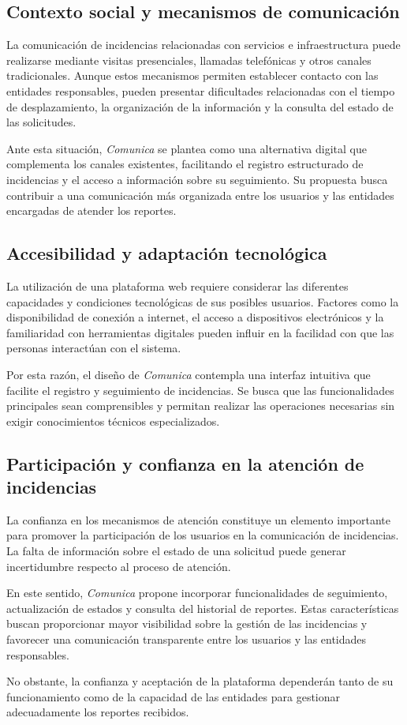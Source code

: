 \subsection{Contexto social y mecanismos de comunicación}
La comunicación de incidencias relacionadas con servicios e infraestructura puede realizarse mediante visitas presenciales, llamadas telefónicas y otros canales tradicionales. Aunque estos mecanismos permiten establecer contacto con las entidades responsables, pueden presentar dificultades relacionadas con el tiempo de desplazamiento, la organización de la información y la consulta del estado de las solicitudes.

Ante esta situación, \textit{Comunica} se plantea como una alternativa digital que complementa los canales existentes, facilitando el registro estructurado de incidencias y el acceso a información sobre su seguimiento. Su propuesta busca contribuir a una comunicación más organizada entre los usuarios y las entidades encargadas de atender los reportes.

\subsection{Accesibilidad y adaptación tecnológica}
La utilización de una plataforma web requiere considerar las diferentes capacidades y condiciones tecnológicas de sus posibles usuarios. Factores como la disponibilidad de conexión a internet, el acceso a dispositivos electrónicos y la familiaridad con herramientas digitales pueden influir en la facilidad con que las personas interactúan con el sistema.

Por esta razón, el diseño de \textit{Comunica} contempla una interfaz intuitiva que facilite el registro y seguimiento de incidencias. Se busca que las funcionalidades principales sean comprensibles y permitan realizar las operaciones necesarias sin exigir conocimientos técnicos especializados.

\subsection{Participación y confianza en la atención de incidencias}
La confianza en los mecanismos de atención constituye un elemento importante para promover la participación de los usuarios en la comunicación de incidencias. La falta de información sobre el estado de una solicitud puede generar incertidumbre respecto al proceso de atención.

En este sentido, \textit{Comunica} propone incorporar funcionalidades de seguimiento, actualización de estados y consulta del historial de reportes. Estas características buscan proporcionar mayor visibilidad sobre la gestión de las incidencias y favorecer una comunicación transparente entre los usuarios y las entidades responsables.

No obstante, la confianza y aceptación de la plataforma dependerán tanto de su funcionamiento como de la capacidad de las entidades para gestionar adecuadamente los reportes recibidos.



